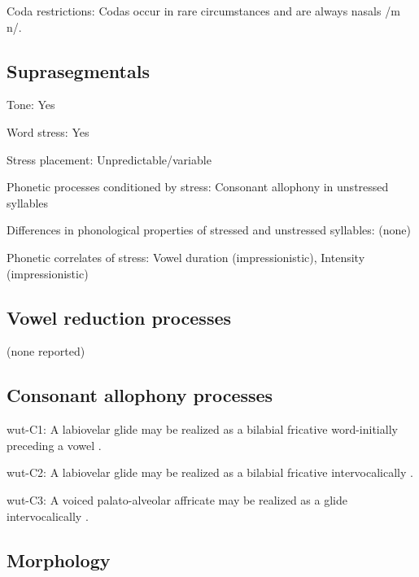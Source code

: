 {\begin{appendixdesc}
\item[Coda restrictions:] Codas occur in rare circumstances and are always nasals /m n/.
\end{appendixdesc}
\subsection*{Suprasegmentals}
\begin{appendixdesc}
\item[Tone:] Yes

\item[Word stress:] Yes

\item[Stress placement:] Unpredictable/variable

\item[Phonetic processes conditioned by stress:] Consonant allophony in unstressed syllables

\item[Differences in phonological properties of stressed and unstressed syllables:] (none)

\item[Phonetic correlates of stress:] Vowel duration (impressionistic), Intensity (impressionistic)
\end{appendixdesc}
\subsection*{Vowel reduction processes}

(none reported)
\subsection*{Consonant allophony processes}
\begin{appendixdesc}

\item[wut-C1:] A labiovelar glide may be realized as a bilabial fricative word-initially preceding a vowel \citep[57--58]{Marmion2010}.

\item[wut-C2:] A labiovelar glide may be realized as a bilabial fricative intervocalically \citep[57--58]{Marmion2010}.

\item[wut-C3:] A voiced palato-alveolar affricate may be realized as a glide intervocalically \citep[55]{Marmion2010}.
\end{appendixdesc}
\subsection*{Morphology}

}
